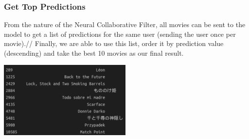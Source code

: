 \subsubsection*{Get Top Predictions}
From the nature of the Neural Collaborative Filter, all movies can be sent to the model to get a list of predictions for the same user (sending the user once per movie).//
Finally, we are able to use this list, order it by prediction value (descending) and take the best 10 movies as our final result.
\begin{center}
    \captionsetup{type=figure}
    \includegraphics[width=250px]{images/nn-top.png}
\end{center}
